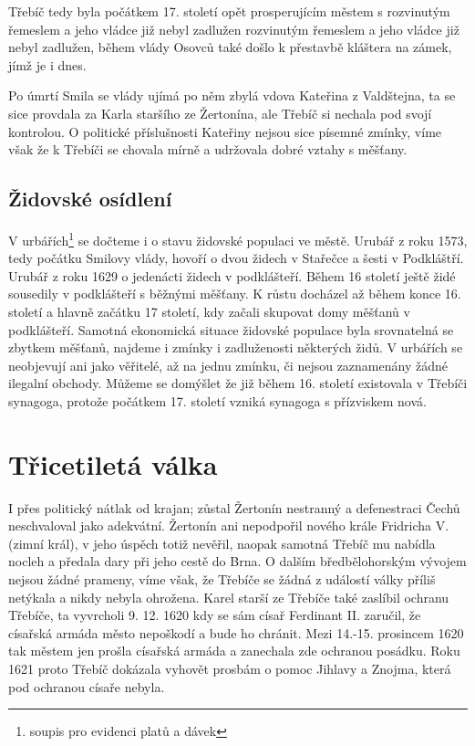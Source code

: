 \documentclass[a4paper,oneside,12p]{report}
\begin{document}
Třebíč tedy byla počátkem 17. století opět prosperujícím městem s rozvinutým řemeslem a jeho vládce již nebyl zadlužen rozvinutým řemeslem a jeho vládce již nebyl zadlužen, během vlády Osovců také došlo k přestavbě kláštera na zámek, jímž je i dnes. %

Po úmrtí Smila se vlády ujímá po něm zbylá vdova Kateřina z Valdštejna, ta se sice provdala za Karla staršího ze Žertonína, ale Třebíč si nechala pod svojí kontrolou.
O politické příslušnosti Kateřiny nejsou sice písemné zmínky, víme však že k Třebíči se chovala mírně a udržovala dobré vztahy s měšťany. %

\subsection{Židovské osídlení}

V urbářích\footnote{soupis pro evidenci platů a dávek} se dočteme i o stavu židovské populaci ve městě.
Urubář z roku 1573, tedy počátku Smilovy vlády, hovoří o dvou židech v Stařečce a šesti v Podkláštří.
Urubář z roku 1629 o jedenácti židech v podklášteří.
Během 16 století ještě židé sousedily v podklášteří s běžnými měšťany.
K růstu docházel až během konce 16. století a hlavně začátku 17 století, kdy začali skupovat domy měšťanů v podklášteří.
Samotná ekonomická situace židovské populace byla srovnatelná se zbytkem měšťanů, najdeme i zmínky i zadluženosti některých židů.
V urbářích se neobjevují ani jako věřitelé, až na jednu zmínku, či nejsou zaznamenány žádné ilegalní obchody.
Můžeme se domýšlet že již během 16. století existovala v Třebíči synagoga, protože počátkem 17. století vzniká synagoga s přízviskem nová. %

\section{Třicetiletá válka}

I přes politický nátlak od krajan; zůstal Žertonín nestranný a defenestraci Čechů neschvaloval jako adekvátní.
Žertonín ani nepodpořil nového krále Fridricha V. (zimní král), v jeho úspěch totiž nevěřil, naopak samotná Třebíč mu nabídla nocleh a předala dary při jeho cestě do Brna.
O dalším bředbělohorským vývojem nejsou žádné prameny, víme však, že Třebíče se žádná z událostí války příliš netýkala a  nikdy nebyla ohrožena.
Karel starší ze Třebíče také zaslíbil ochranu Třebíče, ta vyvrcholi 9. 12. 1620 kdy se sám císař Ferdinant II. zaručil, že císařská armáda město nepoškodí a bude ho chránit.
Mezi 14.-15. prosincem 1620 tak městem jen prošla císařská armáda a zanechala zde ochranou posádku.
Roku 1621 proto Třebíč dokázala vyhovět prosbám o pomoc Jihlavy a Znojma, která pod ochranou císaře nebyla. %
\end{document}
